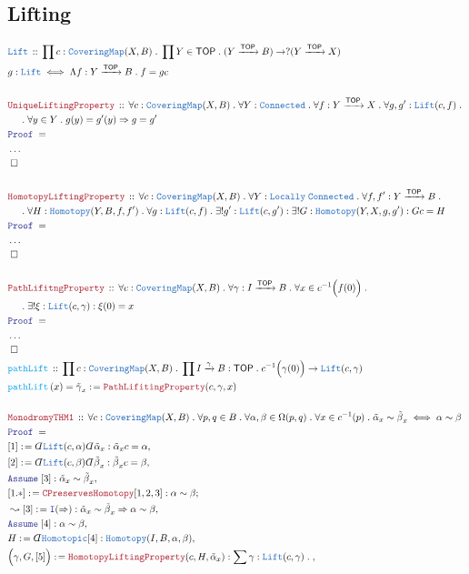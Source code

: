 \documentclass[12pt]{scrartcl}
\newcommand{\TYPE}[1]{\textcolor{NavyBlue}{\mathtt{#1}}}
\newcommand{\FUNC}[1]{\textcolor{Cerulean}{\mathtt{#1}}}
\newcommand{\LOGIC}[1]{\textcolor{Blue}{\mathtt{#1}}}
\newcommand{\THM}[1]{\textcolor{Maroon}{\mathtt{#1}}}
\renewcommand{\.}{\; . \;}
\newcommand{\de}{: \kern 0.1pc =}
\newcommand{\Act}[1]{\left( #1 \right)}
\newcommand{\Theorem}[2]{& \THM{#1} \, :: \, #2 \\ & \Proof = \\ }
\newcommand{\DeclareType}[2]{& \TYPE{#1} \, :: \, #2 \\}
\newcommand{\DefineType}[3]{& #1 : \TYPE{#2} \iff #3 \\}
\newcommand{\DeclareFunc}[2]{& \FUNC{#1} \, :: \, #2 \\}
\newcommand{\DefineNamedFunc}[4]{&  \FUNC{#1}\Act{#2} = #3 \de #4 \\}
\newcommand{\NewLine}{\\ & \kern 1pc}
\newcommand{\Page}[1]{ \begin{align*} #1 \end{align*}   }
\newcommand{ \bd }{ \ByDef }
\newcommand{\NoProof}{ & \ldots \\ \EndProof}
\newcommand{\Imply}{\Rightarrow}
\newcommand{\Intro}{\LOGIC{I}}
\newcommand{\Arrow}{\xrightarrow}
\newcommand{\Say}[3]{& #1 \de #2 : #3, \\}
\newcommand{\Conclude}[3]{& #1 \de #2 : #3; \\}
\newcommand{\Derive}[3]{& \leadsto #1 \de #2 : #3, \\}
\newcommand{\Assume}[2]{& \LOGIC{Assume} \; #1 : #2, \\}
\newcommand{\QED}{\; \square}
\newcommand{\EndProof}{& \QED \\}
\newcommand{\ByDef}{\rotatebox[origin=c]{-180}{$D$}}%
\newcommand{\Proof}{\LOGIC{Proof} \; }
\newcommand{\TOP}{\mathsf{TOP}}
\begin{document}
\subsection{Lifting}
\Page{
	\DeclareType{Lift}{
		\prod c : \TYPE{CoveringMap}(X,B) \. 
		\prod Y \in \TOP \. 
		(Y \Arrow{\TOP} B) \to
		?(Y \Arrow{\TOP} X)
	}
	\DefineType{g}
	{
		Lift
	}
	{
		\Lambda f : Y \Arrow{\TOP} B \. f = g c
	}
	\\
	\Theorem{UniqueLiftingProperty}
	{
		\forall c : \TYPE{CoveringMap}(X,B) \. 
		\forall Y : \TYPE{Connected} \.
		\forall f : Y \Arrow{\TOP} X \. 
		\forall g,g' : \TYPE{Lift}(c,f) \. \NewLine \.
		\forall  y \in Y \.  
		g(y) =  g'(y) \Imply  g = g'
	}
	\NoProof
	\\
	\Theorem{HomotopyLiftingProperty}
	{
		\forall c : \TYPE{CoveringMap}(X,B) \. 
		\forall Y : \TYPE{Locally} \;\TYPE{Connected} \.
		\forall f,f' : Y \Arrow{\TOP} B \. \NewLine \. 
		\forall H : \TYPE{Homotopy}(Y,B,f,f') \. 
		\forall g : \TYPE{Lift}(c,f) \.
		\exists! g' : \TYPE{Lift}(c,g') :
		\exists! G : \TYPE{Homotopy}(Y,X,g,g') :
		G c = H 
	}
	\NoProof
	\\
	\Theorem{PathLifitngProperty}
	{
		\forall c : \TYPE{CoveringMap}(X,B) \.
		\forall \gamma : I \Arrow{\TOP} B \.
		\forall x \in c^{-1} \Big( f(0) \Big) \. \NewLine \.
		\exists! \xi : \TYPE{Lift}(c,\gamma) :
		\xi(0) = x
	}
	\NoProof
	\DeclareFunc{pathLift}
	{
		\prod c : \TYPE{CoveringMap}(X,B) \.
		\prod  I \Arrow{\gamma} B : \TOP  \. 
		c^{-1}\Big( \gamma(0) \Big) \to \TYPE{Lift}(c,\gamma)
	}
	\DefineNamedFunc{pathLift}{x}{{\tilde \gamma}_x}{ \THM{PathLifitingProperty}(c,\gamma,x)  }
	\\
	\Theorem{MonodromyTHM1}
	{
		\forall c : \TYPE{CoveringMap}(X,B) \.
		\forall p,q \in B \. 
		\forall \alpha,\beta \in \Omega(p,q) \.
		\forall x \in c^{-1}(p) \. 
		{\tilde \alpha}_x \sim {\tilde \beta}_x 
		\iff
		\alpha \sim \beta
	}
	\Say{[1]}{\bd \TYPE{Lift}(c,\alpha) \bd {\tilde \alpha}_x }
	{   {\tilde \alpha }_x c = \alpha}
	\Say{[2]}{\bd \TYPE{Lift}(c,\beta) \bd {\tilde \beta}_x }
	{   {\tilde \beta }_x c = \beta}
	\Assume{[3]}{{\tilde \alpha}_x \sim {\tilde \beta}_x}
	\Conclude{[1.*]}{\THM{CPreservesHomotopy}[1,2,3]}
	{
		\alpha \sim \beta
	}
	\Derive{[3]}
	{
		\Intro(\Imply)
	}
	{
		{\tilde \alpha}_x \sim {\tilde \beta}_x 
		\Imply
		\alpha \sim \beta
	}
	\Assume{[4]}
	{
		\alpha \sim \beta	
	}
	\Say{H}{\bd \TYPE{Homotopic}[4]}{\TYPE{Homotopy}(I,B,\alpha,\beta)}
	\Say{\Big(\gamma,G,[5]\Big)}{\THM{HomotopyLiftingProperty}(c,H,{\tilde \alpha}_x)}
	{
		\sum \gamma : \TYPE{Lift}(c,\gamma) \.
}}
\end{document}
